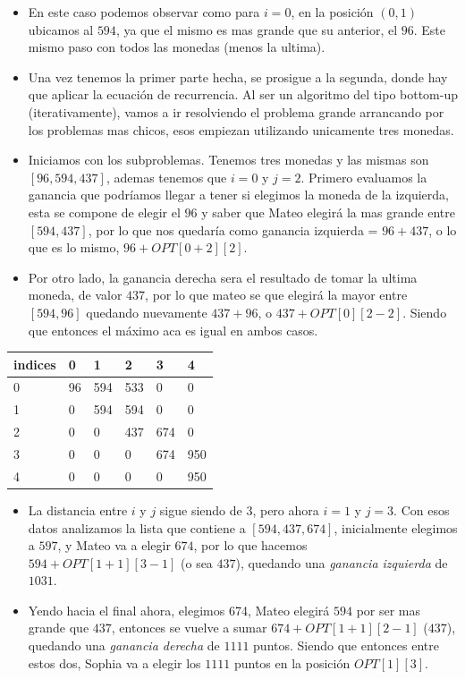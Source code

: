 \begin{itemize}
    \item En este caso podemos observar como para $i = 0$, en la posición $(0, 1)$ ubicamos al $594$, ya que el mismo es mas grande que su anterior, el $96$. Este mismo paso con todos las monedas (menos la ultima).
    \item Una vez tenemos la primer parte hecha, se prosigue a la segunda, donde hay que aplicar la ecuación de recurrencia. Al ser un algoritmo del tipo bottom-up (iterativamente), vamos a ir resolviendo el problema grande arrancando por los problemas mas chicos, esos empiezan utilizando unicamente tres monedas.
    \item Iniciamos con los subproblemas. Tenemos tres monedas y las mismas son $[96, 594, 437]$, ademas tenemos que $i = 0$ y $j = 2$. Primero evaluamos la ganancia que podríamos llegar a tener si elegimos la moneda de la izquierda, esta se compone de elegir el $96$ y saber que Mateo elegirá la mas grande entre $[594, 437]$, por lo que nos quedaría como ganancia izquierda = $96 + 437$, o lo que es lo mismo, $96 + OPT[0+2][2]$.
    \item Por otro lado, la ganancia derecha sera el resultado de tomar la ultima moneda, de valor $437$, por lo que mateo se que elegirá la mayor entre $[594, 96]$ quedando nuevamente $437 + 96$, o $437 + OPT[0][2-2]$. Siendo que entonces el máximo aca es igual en ambos casos.
\end{itemize}
\begin{table}[H]
    \centering
    \begin{tabular}{|l|l|l|l|l|l|}
    \hline
        indices & 0 & 1 & 2 & 3 & 4 \\ \hline
        0 & 96 & 594 & 533 & 0 & 0 \\ \hline
        1 & 0 & 594 & 594 & 0 & 0 \\ \hline
        2 & 0 & 0 & 437 & 674 & 0 \\ \hline
        3 & 0 & 0 & 0 & 674 & 950 \\ \hline
        4 & 0 & 0 & 0 & 0 & 950 \\ \hline
    \end{tabular}
\end{table}
\begin{itemize}
    \item La distancia entre $i$ y $j$ sigue siendo de $3$, pero ahora $i = 1$ y $j = 3$. Con esos datos analizamos la lista que contiene a $[594, 437, 674]$, inicialmente elegimos a $597$, y Mateo va a elegir $674$, por lo que hacemos $594 + OPT[1+1][3-1]$ (o sea $437$), quedando una \textit{ganancia izquierda} de $1031$.
    \item Yendo hacia el final ahora, elegimos 674, Mateo elegirá $594$ por ser mas grande que $437$, entonces se vuelve a sumar $674 + OPT[1+1][2-1]$ ($437$), quedando una \textit{ganancia derecha} de $1111$ puntos. Siendo que entonces entre estos dos, Sophia va a elegir los $1111$ puntos en la posición $OPT[1][3]$.
\end{itemize}
